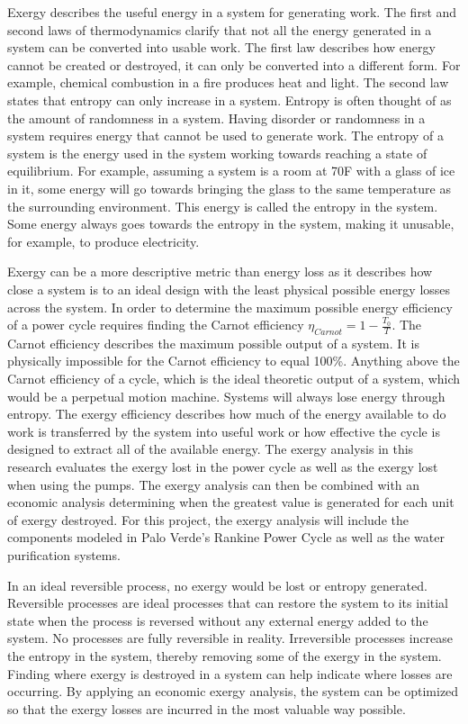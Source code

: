 Exergy describes the useful energy in a system for generating work. The first and second laws of thermodynamics clarify that not all the energy generated in a system can be converted into usable work.  The first law describes how energy cannot be created or destroyed, it can only be converted into a different form.  For example, chemical combustion in a fire produces heat and light. The second law states that entropy can only increase in a system. Entropy is often thought of as the amount of randomness in a system.  Having disorder or randomness in a system requires energy that cannot be used to generate work. The entropy of a system is the energy used in the system working towards reaching a state of equilibrium.  For example, assuming a system is a room at 70\degree F with a glass of ice in it, some energy will go towards bringing the glass to the same temperature as the surrounding environment. This energy is called the entropy in the system. Some energy always goes towards the entropy in the system, making it unusable, for example, to produce electricity.


Exergy can be a more descriptive metric than energy loss as it describes how close a system is to an ideal design with the least physical possible energy losses across the system. In order to determine the maximum possible energy efficiency of a power cycle requires finding the Carnot efficiency $\eta_{Carnot}=1-\frac{T_0}{T}$. The Carnot efficiency describes the maximum possible output of a system. It is physically impossible for the Carnot efficiency to equal 100\%.  Anything above the Carnot efficiency of a cycle, which is the ideal theoretic output of a system, which would be a perpetual motion machine.  Systems will always lose energy through entropy. The exergy efficiency describes how much of the energy available to do work is transferred by the system into useful work or how effective the cycle is designed to extract all of the available energy. The exergy analysis in this research evaluates the exergy lost in the power cycle as well as the exergy lost when using the pumps. The exergy analysis can then be combined with an economic analysis determining when the greatest value is generated for each unit of exergy destroyed. For this project, the exergy analysis will include the components modeled in Palo Verde's Rankine Power Cycle as well as the water purification systems.

In an ideal reversible process, no exergy would be lost or entropy generated. Reversible processes are ideal processes that can restore the system to its initial state when the process is reversed without any external energy added to the system. No processes are fully reversible in reality. Irreversible processes increase the entropy in the system, thereby removing some of the exergy in the system. Finding where exergy is destroyed in a system can help indicate where losses are occurring. By applying an economic exergy analysis, the system can be optimized so that the exergy losses are incurred in the most valuable way possible.

